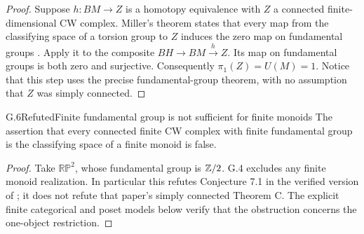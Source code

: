 \begin{proof}
Suppose $h:BM\to Z$ is a homotopy equivalence with $Z$ a connected finite-dimensional CW complex. Miller's theorem states that every map from the classifying space of a torsion group to $Z$ induces the zero map on fundamental groups \citep[Theorem B, p.~40]{Miller1984}. Apply it to the composite $BH\to BM\xrightarrow{h}Z$. Its map on fundamental groups is both zero and surjective. Consequently $\pi_1(Z)=U(M)=1$. Notice that this step uses the precise fundamental-group theorem, with no assumption that $Z$ was simply connected.
\end{proof}

\begin{nrsourceclaim}{G.6}{Refuted}{Finite fundamental group is not sufficient for finite monoids}
The assertion that every connected finite CW complex with finite fundamental group is the classifying space of a finite monoid is false.
\end{nrsourceclaim}
\begin{proof}
Take $\mathbb{RP}^2$, whose fundamental group is $\mathbb{Z}/2$. G.4 excludes any finite monoid realization. In particular this refutes Conjecture 7.1 in the verified version of \citet{BenBassat2026}; it does not refute that paper's simply connected Theorem C. The explicit finite categorical and poset models below verify that the obstruction concerns the one-object restriction.
\end{proof}
